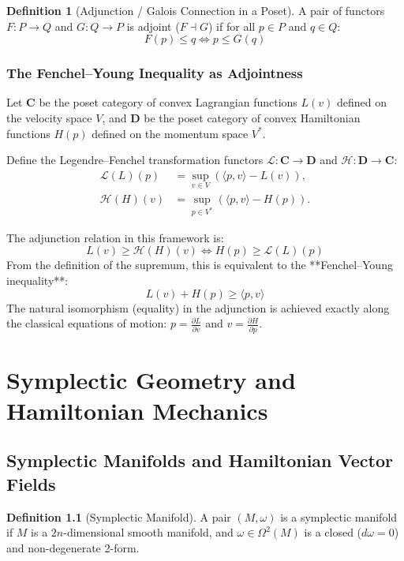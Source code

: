 \documentclass[11pt,a4paper,oneside]{book}
\theoremstyle{definition}
\newtheorem{definition}{Definition}[chapter]
\theoremstyle{plain}
\newcommand{\Cat}[1]{\mathbf{#1}}
\begin{document}
\begin{definition}[Adjunction / Galois Connection in a Poset]
A pair of functors $F: P \to Q$ and $G: Q \to P$ is adjoint ($F \dashv G$) if for all $p \in P$ and $q \in Q$:
\begin{equation}
F(p) \le q \iff p \le G(q)
\end{equation}
\end{definition}

\subsection{The Fenchel--Young Inequality as Adjointness}
Let $\Cat{C}$ be the poset category of convex Lagrangian functions $L(v)$ defined on the velocity space $V$, and $\Cat{D}$ be the poset category of convex Hamiltonian functions $H(p)$ defined on the momentum space $V^*$.

Define the Legendre--Fenchel transformation functors $\mathcal{L}: \Cat{C} \to \Cat{D}$ and $\mathcal{H}: \Cat{D} \to \Cat{C}$:
\begin{align}
\mathcal{L}(L)(p) &= \sup_{v \in V} (\langle p, v \rangle - L(v)), \\
\mathcal{H}(H)(v) &= \sup_{p \in V^*} (\langle p, v \rangle - H(p)).
\end{align}

The adjunction relation in this framework is:
\[ L(v) \ge \mathcal{H}(H)(v) \iff H(p) \ge \mathcal{L}(L)(p) \]
From the definition of the supremum, this is equivalent to the **Fenchel--Young inequality**:
\begin{equation}
L(v) + H(p) \ge \langle p, v \rangle
\end{equation}
The natural isomorphism (equality) in the adjunction is achieved exactly along the classical equations of motion: $p = \frac{\partial L}{\partial v}$ and $v = \frac{\partial H}{\partial p}$.


\chapter{Symplectic Geometry and Hamiltonian Mechanics}

\section{Symplectic Manifolds and Hamiltonian Vector Fields}
\begin{definition}[Symplectic Manifold]
A pair $(M, \omega)$ is a symplectic manifold if $M$ is a $2n$-dimensional smooth manifold, and $\omega \in \Omega^2(M)$ is a closed ($d\omega = 0$) and non-degenerate 2-form.
\end{definition}
\end{document}
